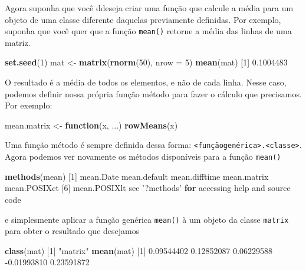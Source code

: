 \documentclass[10pt,a4paper]{book}
\newenvironment{Shaded}{\begin{snugshade}}{\end{snugshade}}
\newcommand{\KeywordTok}[1]{\textcolor[rgb]{0.13,0.29,0.53}{\textbf{#1}}}
\newcommand{\DataTypeTok}[1]{\textcolor[rgb]{0.13,0.29,0.53}{#1}}
\newcommand{\DecValTok}[1]{\textcolor[rgb]{0.00,0.00,0.81}{#1}}
\newcommand{\FloatTok}[1]{\textcolor[rgb]{0.00,0.00,0.81}{#1}}
\newcommand{\StringTok}[1]{\textcolor[rgb]{0.31,0.60,0.02}{#1}}
\newcommand{\ControlFlowTok}[1]{\textcolor[rgb]{0.13,0.29,0.53}{\textbf{#1}}}
\newcommand{\OperatorTok}[1]{\textcolor[rgb]{0.81,0.36,0.00}{\textbf{#1}}}
\newcommand{\NormalTok}[1]{#1}
\begin{document}
Agora suponha que você ddeseja criar uma função que calcule a média para
um objeto de uma classe diferente daquelas previamente definidas. Por
exemplo, suponha que você quer que a função \texttt{mean()} retorne a
média das linhas de uma matriz.

\begin{Shaded}
\begin{Highlighting}[]
\KeywordTok{set.seed}\NormalTok{(}\DecValTok{1}\NormalTok{)}
\NormalTok{mat <-}\StringTok{ }\KeywordTok{matrix}\NormalTok{(}\KeywordTok{rnorm}\NormalTok{(}\DecValTok{50}\NormalTok{), }\DataTypeTok{nrow =} \DecValTok{5}\NormalTok{)}
\KeywordTok{mean}\NormalTok{(mat)}
\NormalTok{[}\DecValTok{1}\NormalTok{] }\FloatTok{0.1004483}
\end{Highlighting}
\end{Shaded}

O resultado é a média de todos os elementos, e não de cada linha. Nesse
caso, podemos definir nossa própria função método para fazer o cálculo
que precisamos. Por exemplo:

\begin{Shaded}
\begin{Highlighting}[]
\NormalTok{mean.matrix <-}\StringTok{ }\ControlFlowTok{function}\NormalTok{(x, ...) }\KeywordTok{rowMeans}\NormalTok{(x)}
\end{Highlighting}
\end{Shaded}

Uma função método é sempre definida dessa forma:
\texttt{\textless{}funçãogenérica\textgreater{}.\textless{}classe\textgreater{}}.
Agora podemos ver novamente os métodos disponíveis para a função
\texttt{mean()}

\begin{Shaded}
\begin{Highlighting}[]
\KeywordTok{methods}\NormalTok{(mean)}
\NormalTok{[}\DecValTok{1}\NormalTok{] mean.Date     mean.default  mean.difftime mean.matrix   mean.POSIXct }
\NormalTok{[}\DecValTok{6}\NormalTok{] mean.POSIXlt }
\NormalTok{see }\StringTok{'?methods'} \ControlFlowTok{for}\NormalTok{ accessing help and source code}
\end{Highlighting}
\end{Shaded}

e simplesmente aplicar a função genérica \texttt{mean()} à um objeto da
classe \texttt{matrix} para obter o resultado que desejamos

\begin{Shaded}
\begin{Highlighting}[]
\KeywordTok{class}\NormalTok{(mat)}
\NormalTok{[}\DecValTok{1}\NormalTok{] }\StringTok{"matrix"}
\KeywordTok{mean}\NormalTok{(mat)}
\NormalTok{[}\DecValTok{1}\NormalTok{]  }\FloatTok{0.09544402}  \FloatTok{0.12852087}  \FloatTok{0.06229588} \OperatorTok{-}\FloatTok{0.01993810}  \FloatTok{0.23591872}
\end{Highlighting}
\end{Shaded}
\end{document}
